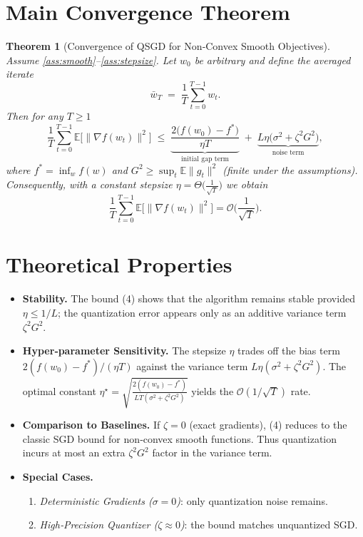 \documentclass{article}
\newtheorem{theorem}{Theorem}
\begin{document}
\section*{Main Convergence Theorem}
\begin{theorem}[Convergence of QSGD for Non‑Convex Smooth Objectives]\label{thm:convergence}
Assume \ref{ass:smooth}–\ref{ass:stepsize}. Let $w_{0}$ be arbitrary and define the averaged iterate
\[
\bar w_{T}\;=\;\frac{1}{T}\sum_{t=0}^{T-1}w_{t}.
\]
Then for any $T\ge1$
\[
\frac{1}{T}\sum_{t=0}^{T-1}\mathbb{E}\!\big[\|\nabla f(w_{t})\|^{2}\big]
\;\le\;
\underbrace{\frac{2\big(f(w_{0})-f^{*}\big)}{\eta T}}_{\text{initial gap term}}
\;+\;
\underbrace{L\eta\big(\sigma^{2}+\zeta^{2}G^{2}\big)}_{\text{noise term}},
\tag{4}
\]
where $f^{*}=\inf_{w}f(w)$ and $G^{2}\ge\sup_{t}\mathbb{E}\|g_{t}\|^{2}$ (finite under the assumptions).  
Consequently, with a constant stepsize $\eta=\Theta\!\big(\tfrac{1}{\sqrt{T}}\big)$ we obtain
\[
\frac{1}{T}\sum_{t=0}^{T-1}\mathbb{E}\!\big[\|\nabla f(w_{t})\|^{2}\big]=\mathcal{O}\!\Big(\frac{1}{\sqrt{T}}\Big).
\]
\end{theorem}

\section*{Theoretical Properties}
\begin{itemize}[leftmargin=*]
\item \textbf{Stability.} The bound (4) shows that the algorithm remains stable provided $\eta\le 1/L$; the quantization error appears only as an additive variance term $\zeta^{2}G^{2}$.
\item \textbf{Hyper‑parameter Sensitivity.} The stepsize $\eta$ trades off the bias term $2(f(w_{0})-f^{*})/(\eta T)$ against the variance term $L\eta(\sigma^{2}+\zeta^{2}G^{2})$. The optimal constant $\eta^{\star}= \sqrt{ \frac{2(f(w_{0})-f^{*})}{L T(\sigma^{2}+\zeta^{2}G^{2})}}$ yields the $\mathcal{O}(1/\sqrt{T})$ rate.
\item \textbf{Comparison to Baselines.} If $\zeta=0$ (exact gradients), (4) reduces to the classic SGD bound for non‑convex smooth functions. Thus quantization incurs at most an extra $\zeta^{2}G^{2}$ factor in the variance term.
\item \textbf{Special Cases.}
    \begin{enumerate}
        \item \emph{Deterministic Gradients ($\sigma=0$)}: only quantization noise remains.
        \item \emph{High‑Precision Quantizer ($\zeta\approx0$)}: the bound matches unquantized SGD.
    \end{enumerate}
\end{itemize}
\end{document}
